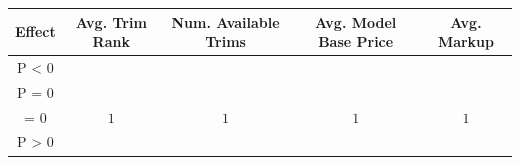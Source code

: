 \begin{tabular}{ccccc}
\toprule
Effect & Avg. Trim Rank & Num. Available Trims & Avg. Model Base Price & Avg. Markup \\
\midrule
P \textless{} 0 \\
\midrule
\midrule
P = 0 \\
\midrule
= 0 & $1$ & $1$ & $1$ & $1$ \\
\midrule
P \textgreater{} 0 \\
\midrule
\bottomrule
\end{tabular}

